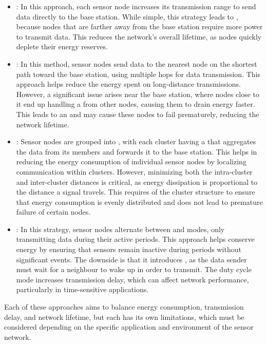 \documentclass[a4paper, 12pt]{report}
\begin{document}
    \begin{itemize}
        \item {}: In this approach, each sensor node increases its transmission range to send data directly to the base station. While simple, this strategy leads to , because nodes that are farther away from the base station require more power to transmit data. This reduces the network's overall lifetime, as nodes quickly deplete their energy reserves.
        \item {}: In this method, sensor nodes send data to the nearest node on the shortest path toward the base station, using multiple hops for data transmission. This approach helps reduce the energy spent on long-distance transmissions. However, a significant issue arises near the base station, where nodes close to it end up handling a  from other nodes, causing them to drain energy faster. This leads to an  and may cause these nodes to fail prematurely, reducing the network lifetime.
        \item {}: Sensor nodes are grouped into , with each cluster having a  that aggregates the data from its members and forwards it to the base station. This helps in reducing the energy consumption of individual sensor nodes by localizing communication within clusters. However, minimizing both the intra-cluster and inter-cluster distances is critical, as energy dissipation is proportional to the distance a signal travels. This requires  of the cluster structure to ensure that energy consumption is evenly distributed and does not lead to premature failure of certain nodes.
        \item {}: In this strategy, sensor nodes alternate between  and  modes, only transmitting data during their active periods. This approach helps conserve energy by ensuring that sensors remain inactive during periods without significant events. The downside is that it introduces , as the data sender must wait for a neighbour to wake up in order to transmit. The duty cycle mode increases transmission delay, which can affect network performance, particularly in time-sensitive applications.
    \end{itemize}

    Each of these approaches aims to balance energy consumption, transmission delay, and network lifetime, but each has its own limitations, which must be considered depending on the specific application and environment of the sensor network.
\end{document}
